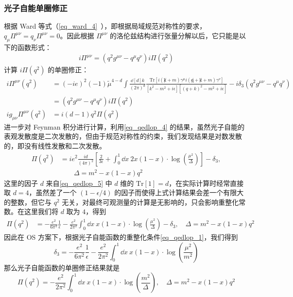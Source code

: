\subsubsection{光子自能单圈修正}
根据 Ward 等式（\autoref{eq_ward_4}~），即根据局域规范对称性的要求，$q_\mu\Pi^{\mu\nu}=q_\nu \Pi^{\mu\nu}=0$。因此根据 $\Pi^{\mu\nu}$ 的洛伦兹结构进行张量分解以后，它只能是以下的函数形式：
\begin{equation}
\begin{aligned}
i\Pi^{\mu\nu}=(q^2g^{\mu\nu}-q^\mu q^\nu)i\Pi(q^2)
\end{aligned}
\end{equation}
计算 $i\Pi(q^2)$ 的单圈修正：
\begin{equation}
\begin{aligned}
i\Pi^{\mu\nu}(q^2)&=(-ie)^2 (-1) \tilde{\mu}^{4-d}\int\frac{\dd[d]{k}}{(2\pi)^d} \frac{\text{Tr}[i(\not k+m)\gamma^\mu i(\not q+\not k+m)\gamma^\nu]}{[k^2-m^2+i\epsilon][(q+k)^2-m^2+i\epsilon]}-i\delta_3 (q^2 g^{\mu\nu}-q^\mu q^\nu)\\
&=(q^2g^{\mu\nu}-q^\mu q^\nu)i\Pi(q^2)\\
i g_{\mu\nu}\Pi^{\mu\nu}(q^2) &= i (d-1) q^2 \Pi(q^2)
\end{aligned}
\end{equation}
进一步对 Feynman 积分进行计算，利用\autoref{eq_qedlop_4} 的结果，虽然光子自能的表观发散度是二次发散的，但由于规范对称性的约束，我们发现结果是对数发散的，即没有线性发散和二次发散。
\begin{equation}
\begin{aligned}
\Pi(q^2)&=i e^2 \frac{id}{(4\pi)^2}\left[\frac{2}{3\epsilon}+\int_0^1 \dd x\ 2x(1-x)\cdot\log\left(\frac{\mu^2}{\Delta}\right)\right] - \delta_3,\\
&\quad\quad \Delta = m^2-x(1-x)q^2
\end{aligned}
\end{equation}
这里的因子 $d$ 来自\autoref{eq_qedlop_5} 中 $d$ 维的 $\text{Tr}[1]=d$，在实际计算时经常直接取 $d=4$，虽然差了一个 $(1-\epsilon/4)$ 的因子而使得上式计算结果会差一个有限大的整数，但它与 $q^2$ 无关，对最终可观测量的计算是无影响的，只会影响重整化常数。在这里我们将 $d$ 取为 $4$，得到
\begin{equation}
\begin{aligned}
\Pi(q^2)&=-\frac{e^2}{6\pi^2}\frac{1}{\epsilon}-\frac{e^2}{2\pi^2}\int_0^1 \dd x\ x(1-x)\cdot\log\left(\frac{\mu^2}{\Delta}\right) - \delta_3,\quad \Delta = m^2-x(1-x)q^2
\end{aligned}
\end{equation}
因此在 OS 方案下，根据光子自能函数的重整化条件\autoref{eq_qedlop_1}，我们得到
\begin{equation}
\delta_3 = -\frac{e^2}{6\pi^2}\frac{1}{\epsilon}-\frac{e^2}{2\pi^2}\int_0^1 \dd x\ x(1-x)\cdot\log\left(\frac{\mu^2}{m^2}\right)
\end{equation}
那么光子自能函数的单圈修正结果就是
\begin{equation}
\Pi(q^2)=-\frac{e^2}{2\pi^2}\int_0^1 \dd x\ x(1-x)\cdot\log\left(\frac{m^2}{\Delta}\right),\quad \Delta = m^2-x(1-x)q^2
\end{equation}



